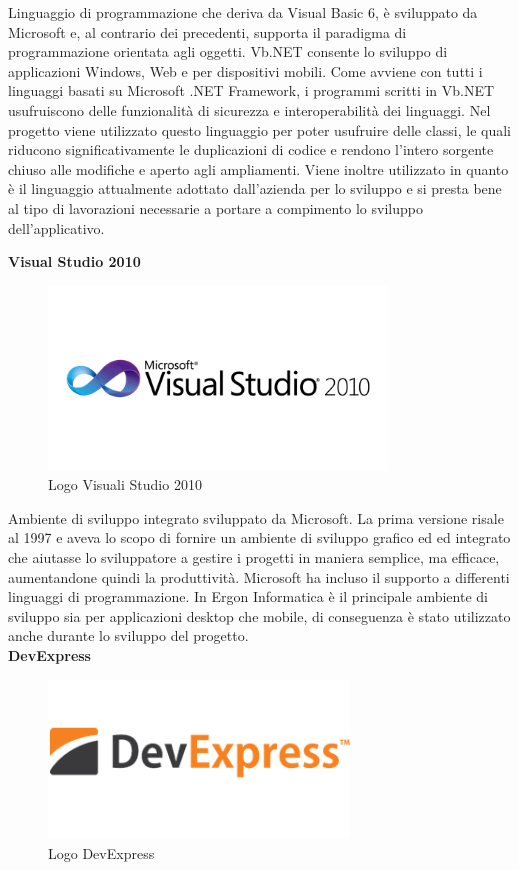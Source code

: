 Linguaggio di programmazione che deriva da Visual Basic 6, è sviluppato da Microsoft e, al contrario dei precedenti, supporta il paradigma di programmazione orientata agli oggetti.
Vb.NET consente lo sviluppo di applicazioni Windows, Web e per dispositivi mobili. 
Come avviene con tutti i linguaggi basati su Microsoft .NET Framework,
i programmi scritti in Vb.NET usufruiscono delle funzionalità di sicurezza e interoperabilità dei linguaggi.
Nel progetto viene utilizzato questo linguaggio per poter usufruire delle classi, le quali riducono significativamente le duplicazioni di codice e rendono l'intero sorgente 
chiuso alle modifiche e aperto agli ampliamenti. Viene inoltre utilizzato in quanto è il linguaggio attualmente adottato dall'azienda per lo sviluppo e si presta bene
al tipo di lavorazioni necessarie a portare a compimento lo sviluppo dell'applicativo.

\newpage
\textbf{Visual Studio 2010}

\begin{figure}[H]
	\includegraphics[width=9cm]{immagini/microsoft-visual-studio-2010-logo.png}
	\centering
	\caption{Logo Visuali Studio 2010}
\end{figure}

Ambiente di sviluppo integrato sviluppato da Microsoft. 
La prima versione risale al 1997 e aveva lo scopo di fornire
un ambiente di sviluppo grafico ed  ed integrato che aiutasse lo sviluppatore a gestire i progetti in maniera semplice, ma efficace, aumentandone quindi la produttività.
Microsoft ha incluso il supporto a differenti linguaggi di programmazione.
In Ergon Informatica è il principale ambiente di sviluppo sia per applicazioni desktop che mobile, di conseguenza è stato utilizzato anche durante lo sviluppo del progetto.\\

\textbf{DevExpress}

\begin{figure}[H]
	\includegraphics[width=8cm]{immagini/devexpress.png}
	\centering
	\caption{Logo DevExpress}
\end{figure}


